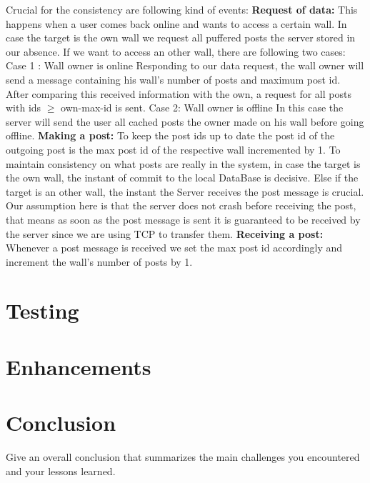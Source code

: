\documentclass{report}
\begin{document}
Crucial for the consistency are following kind of events:\newline
\textbf{Request of data:} This happens when a user comes back online and wants to access a certain wall.  
In case the target is the own wall we request all puffered posts the server stored in our absence.
If we want to access an other wall, there are following two cases:\newline
Case 1 : Wall owner is online
Responding to our data request, the wall owner will send a message containing his wall's number of posts and maximum post id. After comparing this received information with the own, a request for all posts with ids $\geq$ own-max-id is sent.\newline
Case 2: Wall owner is offline
In this case the server will send the user all cached posts the owner made on his wall before going offline.\newline
\textbf{Making a post:}
To keep the post ids up to date the post id of the outgoing post is the max post id of the respective wall incremented by 1.\newline
To maintain consistency on what posts are really in the system, in case the target is the own wall, the instant of commit to the local DataBase is decisive.
Else if the target is an other wall, the instant the Server receives the post message is crucial. Our assumption here is that the server does not crash before receiving the post, that means as soon as the post message is sent it is guaranteed to be received by the server since we are using TCP to transfer them.\newline
\textbf{Receiving a post:}
Whenever a post message is received we set the max post id accordingly and increment the wall's number of posts by 1.


\section{Testing}

\section{Enhancements}

\section{Conclusion}

Give an overall conclusion that summarizes the main challenges you encountered and your lessons learned.



\end{document}
